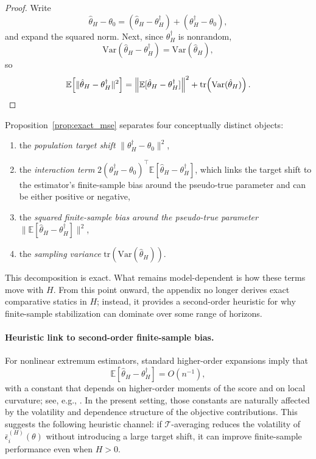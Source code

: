 \begin{proof}
	Write
	\[
	\hat{\theta}_H-\theta_0
	=
	(\hat{\theta}_H-\theta_H^\dagger)
	+
	(\theta_H^\dagger-\theta_0),
	\]
	and expand the squared norm.
	Next, since $\theta_H^\dagger$ is nonrandom,
	\[
	\mathrm{Var}(\hat{\theta}_H-\theta_H^\dagger)
	=
	\mathrm{Var}(\hat{\theta}_H),
	\]
	so
	\[
	\mathbb{E}\!\left[
	\|\hat{\theta}_H-\theta_H^\dagger\|^2
	\right]
	=
	\left\|
	\mathbb{E}[\hat{\theta}_H-\theta_H^\dagger]
	\right\|^2
	+
	\mathrm{tr}\!\left(
	\mathrm{Var}(\hat{\theta}_H)
	\right).
	\qedhere
	\]
\end{proof}

Proposition~\ref{prop:exact_mse} separates four conceptually distinct objects:
\begin{enumerate}
	\item the \emph{population target shift} $\|\theta_H^\dagger-\theta_0\|^2$,
	\item the \emph{interaction term}
	$2(\theta_H^\dagger-\theta_0)^\top \mathbb{E}[\hat{\theta}_H-\theta_H^\dagger]$,
	which links the target shift to the estimator's finite-sample bias around the pseudo-true parameter and can be either positive or negative,
	\item the \emph{squared finite-sample bias around the pseudo-true parameter}
	$\|\mathbb{E}[\hat{\theta}_H-\theta_H^\dagger]\|^2$,
	\item the \emph{sampling variance} $\mathrm{tr}(\mathrm{Var}(\hat{\theta}_H))$.
\end{enumerate}

This decomposition is exact.
What remains model-dependent is how these terms move with $H$.
From this point onward, the appendix no longer derives exact comparative statics in $H$; instead, it provides a second-order heuristic for why finite-sample stabilization can dominate over some range of horizons.

\paragraph{Heuristic link to second-order finite-sample bias.}
For nonlinear extremum estimators, standard higher-order expansions imply that
\[
\mathbb{E}[\hat{\theta}_H-\theta_H^\dagger]
=
O(n^{-1}),
\]
with a constant that depends on higher-order moments of the score and on local curvature; see, e.g., \citet{nagar1959bias, rilstone1996second, newey2004higher, bao2007finite}.
In the present setting, those constants are naturally affected by the volatility and dependence structure of the objective contributions.
This suggests the following heuristic channel:
if $\mathcal{T}$-averaging reduces the volatility of $\bar{\epsilon}_i^{(H)}(\theta)$ without introducing a large target shift, it can improve finite-sample performance even when $H>0$.

